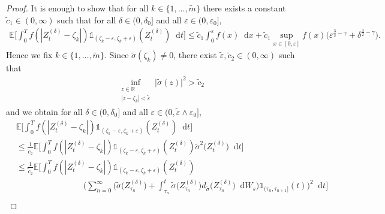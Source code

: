 \documentclass[11pt,a4paper]{article}
\numberwithin{equation}{section}
\theoremstyle{definition}
\newcommand{\E}{{\mathbb{E}}}
\newcommand{\R}{{\mathbb{R}}}
\newcommand{\diff}{\mathop{}\!\mathrm{d}}
\begin{document}
\begin{proof}
    It is enough to show that for all $k\in\{1,\ldots,\widetilde m\}$ there exists a constant $\widetilde c_1\in(0,\infty)$ such that for all $\delta\in(0,\delta_0]$ and all $\varepsilon \in(0,\varepsilon_0]$,
    \begin{equation}
        \begin{aligned}
            \E\Big[\int_0^T f(|Z^{(\delta)}_t-\zeta_k| )\mathds{1}_{(\zeta_k-\varepsilon, \zeta_k + \varepsilon)}(Z^{(\delta)}_t)\diff t]
            \leq \widetilde c_1 \int_0^\varepsilon f(x)\diff x + \widetilde c_1 \sup_{x\in[0,\varepsilon]}f(x) \big(\varepsilon^{\frac{3}{2}-\gamma } +\delta^{\frac{3}{2}-\gamma}\big).
        \end{aligned}
    \end{equation}
    Hence we fix $k\in\{1,\ldots,\widetilde m\}$. 
    Since $\widetilde\sigma(\zeta_k)\neq 0$, there exist $\widetilde \varepsilon, \widetilde c_2 \in(0,\infty)$ such that
    \begin{equation}\label{pOTE26}
        \begin{aligned}
        &\inf_{\substack{z\in\R\\|z-\zeta_k|<\widetilde \varepsilon} } \big|\widetilde\sigma(z)\big|^2 >\widetilde c_2
        \end{aligned}
    \end{equation}
    and we obtain for all $\delta\in(0,\delta_0]$ and all $\varepsilon \in(0, \widetilde \varepsilon \wedge \varepsilon_0]$,
    \begin{equation}
        \begin{aligned}\label{pOTE27}
            &\E\Big[\int_0^T f(|Z^{(\delta)}_{t}-\zeta_k|)\mathds{1}_{(\zeta_k-\varepsilon, \zeta_k+\varepsilon)}(Z^{(\delta)}_{t}) \diff 
            t \Big]\\
            &\leq \frac{1}{\widetilde c_2} \E\Big[\int_0^T f(|Z^{(\delta)}_{t}-\zeta_k|)\mathds{1}_{(\zeta_k-\varepsilon, \zeta_k+\varepsilon)}(Z^{(\delta)}_{t})\widetilde\sigma^2 \big(Z^{(\delta)}_{t}\big) \diff 
            t \Big]\\
            &\leq  \frac{1}{\widetilde c_2} \E\Big[\int_0^T f(|Z^{(\delta)}_{t}-\zeta_k|)\mathds{1}_{(\zeta_k-\varepsilon, \zeta_k+\varepsilon)}(Z^{(\delta)}_{t})\\ 
            &\quad\quad\quad\quad \quad\quad\quad\quad \Big(\sum_{n=0}^{\infty}\Big( \widetilde\sigma \big(Z^{(\delta)}_{\tau_n}\big) + \int_{\tau_n}^t \widetilde\sigma \big(Z^{(\delta)}_{\tau_n}\big)d_{\widetilde\sigma} \big(Z^{(\delta)}_{\tau_n}\big)\diff W_s \Big)\mathds{1}_{(\tau_n,\tau_{n+1}]}(t) \Big)^2 \diff t \Big]\\

\end{aligned}
\end{equation}
\end{proof}
\end{document}
